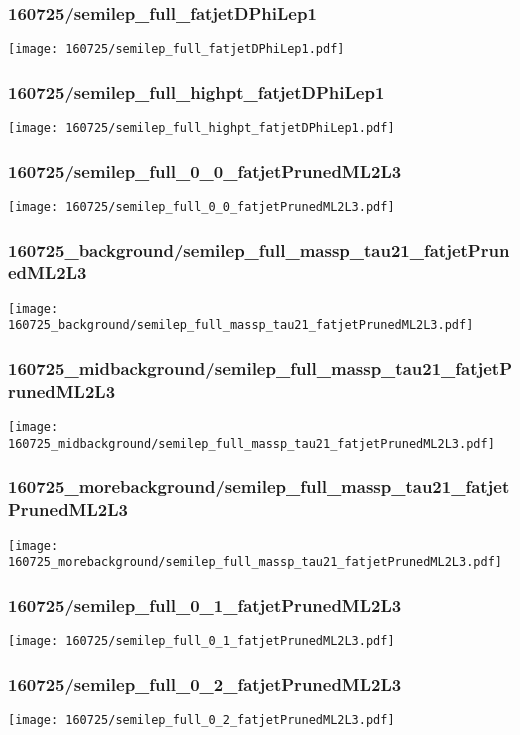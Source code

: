 \begin{frame}
   \frametitle{\small 160725/semilep\_full\_fatjetDPhiLep1}
   \centering
   \texttt{[image: 160725/semilep\_full\_fatjetDPhiLep1.pdf]}
\end{frame}

\begin{frame}
   \frametitle{\small 160725/semilep\_full\_highpt\_fatjetDPhiLep1}
   \centering
   \texttt{[image: 160725/semilep\_full\_highpt\_fatjetDPhiLep1.pdf]}
\end{frame}

\begin{frame}
   \frametitle{\small 160725/semilep\_full\_0\_0\_fatjetPrunedML2L3}
   \centering
   \texttt{[image: 160725/semilep\_full\_0\_0\_fatjetPrunedML2L3.pdf]}
\end{frame}

\begin{frame}
   \frametitle{\small 160725\_background/semilep\_full\_massp\_tau21\_fatjetPrunedML2L3}
   \centering
   \texttt{[image: 160725\_background/semilep\_full\_massp\_tau21\_fatjetPrunedML2L3.pdf]}
\end{frame}

\begin{frame}
   \frametitle{\small 160725\_midbackground/semilep\_full\_massp\_tau21\_fatjetPrunedML2L3}
   \centering
   \texttt{[image: 160725\_midbackground/semilep\_full\_massp\_tau21\_fatjetPrunedML2L3.pdf]}
\end{frame}

\begin{frame}
   \frametitle{\small 160725\_morebackground/semilep\_full\_massp\_tau21\_fatjetPrunedML2L3}
   \centering
   \texttt{[image: 160725\_morebackground/semilep\_full\_massp\_tau21\_fatjetPrunedML2L3.pdf]}
\end{frame}

\begin{frame}
   \frametitle{\small 160725/semilep\_full\_0\_1\_fatjetPrunedML2L3}
   \centering
   \texttt{[image: 160725/semilep\_full\_0\_1\_fatjetPrunedML2L3.pdf]}
\end{frame}

\begin{frame}
   \frametitle{\small 160725/semilep\_full\_0\_2\_fatjetPrunedML2L3}
   \centering
   \texttt{[image: 160725/semilep\_full\_0\_2\_fatjetPrunedML2L3.pdf]}
\end{frame}

